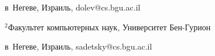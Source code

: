 в~Негеве, Израиль, dolev@cs.bgu.ac.il





\noindent


$^2$Факультет компьютерных наук, Университет Бен-Гурион


в~Негеве, Израиль, sadetsky@cs.bgu.ac.il





\vspace*{6pt}





\def\leftfootline{\small{\textbf{\thepage}


\hfill ИНФОРМАТИКА И ЕЁ ПРИМЕНЕНИЯ\ \ \ том\ 9\ \ \ выпуск\ 1\ \ \ 2015}


}%


 \def\rightfootline{\small{ИНФОРМАТИКА И ЕЁ ПРИМЕНЕНИЯ\ \ \ том\ 9\ \ \ выпуск\ 1\ \ \ 2015


\hfill \textbf{\thepage}}}








